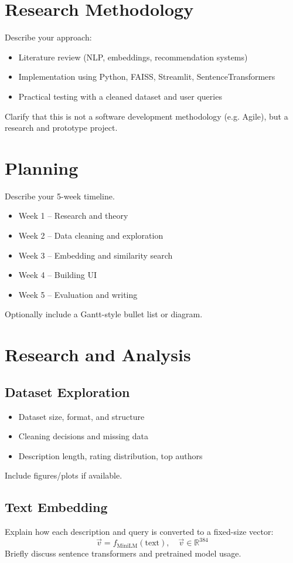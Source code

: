 \section{Research Methodology}
Describe your approach:
\begin{itemize}
  \item Literature review (NLP, embeddings, recommendation systems)
  \item Implementation using Python, FAISS, Streamlit, SentenceTransformers
  \item Practical testing with a cleaned dataset and user queries
\end{itemize}
Clarify that this is not a software development methodology (e.g. Agile), but a research and prototype project.

\section{Planning}
Describe your 5-week timeline.
\begin{itemize}
  \item Week 1 – Research and theory
  \item Week 2 – Data cleaning and exploration
  \item Week 3 – Embedding and similarity search
  \item Week 4 – Building UI
  \item Week 5 – Evaluation and writing
\end{itemize}
Optionally include a Gantt-style bullet list or diagram.

\section{Research and Analysis}

\subsection{Dataset Exploration}
\begin{itemize}
  \item Dataset size, format, and structure
  \item Cleaning decisions and missing data
  \item Description length, rating distribution, top authors
\end{itemize}
Include figures/plots if available.

\subsection{Text Embedding}
Explain how each description and query is converted to a fixed-size vector:
\[
\vec{v} = f_{\text{MiniLM}}(\text{text}), \quad \vec{v} \in \mathbb{R}^{384}
\]
Briefly discuss sentence transformers and pretrained model usage.

